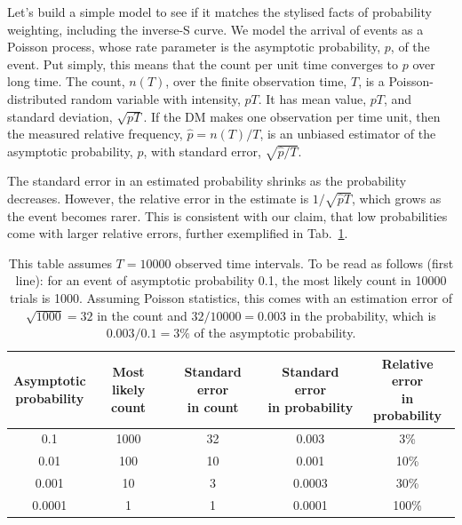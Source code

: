 \documentclass[a4paper, 12pt]{article}
\newcommand{\tlabel}[1]{\label{tab:#1}}
\newcommand{\tref}[1]{Tab.~\ref{tab:#1}}
\begin{document}
Let's build a simple model to see if it matches the stylised facts of probability weighting, including the inverse-S curve. We model the arrival of events as a Poisson process, whose rate parameter is the asymptotic probability, $p$, of the event. Put simply, this means that the count per unit time converges to $p$ over long time. The count, $n(T)$, over the finite observation time, $T$, is a Poisson-distributed random variable with intensity, $pT$. It has mean value, $pT$, and standard deviation, $\sqrt{pT}$. If the DM makes one observation per time unit, then the measured relative frequency, $\hat{p} = n(T)/T$, is an unbiased estimator of the asymptotic probability, $p$, with standard error, $\sqrt{\hat{p}/T}$.

The standard error in an estimated probability shrinks as the probability decreases. However, the relative error in the estimate is $1/\sqrt{\hat{p}T}$, which grows as the event becomes rarer. This is consistent with our claim, that low probabilities come with larger relative errors, further exemplified in \tref{errors}. 

\begin{table}[!htb]
\centering
\begin{tabular}{@{}ccccc@{}}
\toprule[2pt]
\makecell{Asymptotic\\probability} & \makecell{Most likely\\count} & \makecell{Standard error\\in count} & \makecell{Standard error\\in probability} & \makecell{Relative error\\in probability}\\
\midrule[2pt]
0.1 & 1000 & 32 & 0.003 & 3\%\\
0.01 & 100 & 10 & 0.001 & 10\%\\
0.001 & 10 & 3 & 0.0003& 30\%\\
0.0001 & 1 & 1 & 0.0001 &100\%\\
\bottomrule[2pt]
\end{tabular}
\caption{This table assumes $T = 10000$ observed time intervals. To be read as follows (first line): for an event of asymptotic probability 0.1, the most likely count in 10000 trials is 1000. Assuming Poisson statistics, this comes with an estimation error of $\sqrt{1000} = 32$ in the count and $32/10000 = 0.003$ in the probability, which is $0.003/0.1=3\%$ of the asymptotic probability.}\tlabel{errors}
\end{table}
\end{document}
